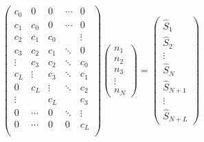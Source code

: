 \documentclass[12pt]{article}
\begin{document}
	\begin{equation}
		\begin{pmatrix} 
			c_0   &  0   &  0   &\dotsm&  0     \\
			c_1   & c_0  &  0   &\dotsm&  0     \\
			c_2   & c_1  & c_0  &      & \vdots \\
			c_3   & c_2  & c_1  &\ddots&  0     \\
     	    \vdots& c_3  & c_2  &\ddots&  c_0   \\
			c_L   &\vdots& c_3  &\ddots&  c_1   \\
			0     & c_L  &\vdots&\ddots&  c_2   \\
			\vdots&      & c_L  &      &  c_3   \\
			0     &\dotsm&  0   &\ddots& \vdots \\
			0     &\dotsm& 0    &   0  &  c_L   \\
		\end{pmatrix}
		\begin{pmatrix} 
			n_1 \\ n_2 \\ n_3 \\ \vdots \\ n_N
		\end{pmatrix}
		=
		\begin{pmatrix} 
			\hat{S}_1 \\ \hat{S}_2 \\
			\vdots \\
			\hat{S}_N \\ \hat{S}_{N+1} \\
			\vdots \\
			\hat{S}_{N+L}
		\end{pmatrix}
		\label{eq:mean_matrix}
	\end{equation}
	
\end{document}
